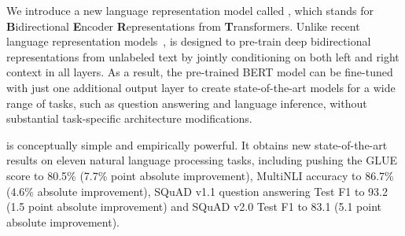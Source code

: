 We introduce a new language representation model called {\bf \bert}, which stands for \textbf{B}idirectional \textbf{E}ncoder \textbf{R}epresentations from \textbf{T}ransformers. Unlike recent language representation models~\cite{peters-etal:2018:_deep, radford-etal:2018},  \bert is designed to pre-train deep bidirectional representations from unlabeled text by jointly conditioning on both left and right context in all layers. As a result, the pre-trained BERT model can be fine-tuned with just one additional output layer to create state-of-the-art models for a wide range of tasks, such as question answering and language inference, without substantial task-specific architecture modifications. 

\bert is conceptually simple and empirically powerful. It obtains new state-of-the-art results on eleven natural language processing tasks, including pushing the GLUE score to 80.5\% (7.7\% point absolute improvement), MultiNLI accuracy to 86.7\% (4.6\% absolute improvement), SQuAD v1.1 question answering Test F1 to 93.2 (1.5 point absolute improvement) and SQuAD v2.0 Test F1 to 83.1 (5.1 point absolute improvement).

